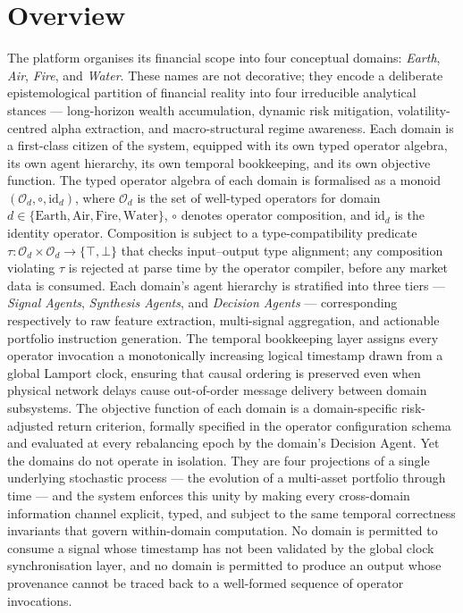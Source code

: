 \documentclass[12pt,openany]{book}
\numberwithin{equation}{chapter}
\theoremstyle{plain}
\theoremstyle{definition}
\theoremstyle{remark}
\begin{document}
\section{Overview}

The platform organises its financial scope into four conceptual domains: \emph{Earth}, \emph{Air}, \emph{Fire}, and \emph{Water}. These names are not decorative; they encode a deliberate epistemological partition of financial reality into four irreducible analytical stances — long-horizon wealth accumulation, dynamic risk mitigation, volatility-centred alpha extraction, and macro-structural regime awareness. Each domain is a first-class citizen of the system, equipped with its own typed operator algebra, its own agent hierarchy, its own temporal bookkeeping, and its own objective function. The typed operator algebra of each domain is formalised as a monoid $(\mathcal{O}_d, \circ, \mathrm{id}_d)$, where $\mathcal{O}_d$ is the set of well-typed operators for domain $d \in \{\mathrm{Earth}, \mathrm{Air}, \mathrm{Fire}, \mathrm{Water}\}$, $\circ$ denotes operator composition, and $\mathrm{id}_d$ is the identity operator. Composition is subject to a type-compatibility predicate $\tau : \mathcal{O}_d \times \mathcal{O}_d \to \{\top, \bot\}$ that checks input--output type alignment; any composition violating $\tau$ is rejected at parse time by the operator compiler, before any market data is consumed. Each domain's agent hierarchy is stratified into three tiers — \emph{Signal Agents}, \emph{Synthesis Agents}, and \emph{Decision Agents} — corresponding respectively to raw feature extraction, multi-signal aggregation, and actionable portfolio instruction generation. The temporal bookkeeping layer assigns every operator invocation a monotonically increasing logical timestamp drawn from a global Lamport clock, ensuring that causal ordering is preserved even when physical network delays cause out-of-order message delivery between domain subsystems. The objective function of each domain is a domain-specific risk-adjusted return criterion, formally specified in the operator configuration schema and evaluated at every rebalancing epoch by the domain's Decision Agent. Yet the domains do not operate in isolation. They are four projections of a single underlying stochastic process — the evolution of a multi-asset portfolio through time — and the system enforces this unity by making every cross-domain information channel explicit, typed, and subject to the same temporal correctness invariants that govern within-domain computation. No domain is permitted to consume a signal whose timestamp has not been validated by the global clock synchronisation layer, and no domain is permitted to produce an output whose provenance cannot be traced back to a well-formed sequence of operator invocations.
\end{document}
